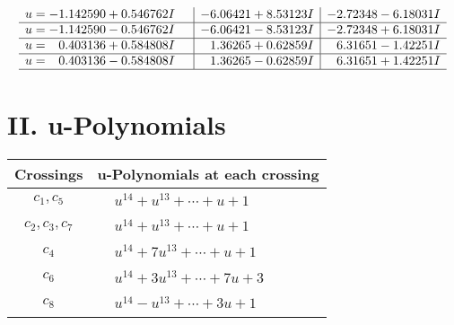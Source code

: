 \documentclass[1p]{elsarticle_modified}
\theoremstyle{definition}
\begin{document}
$$\begin{array}{c|c|c}
\begin{aligned}
u &= -1.142590 + 0.546762 I\end{aligned}
 & -6.06421 + 8.53123 I & -2.72348 - 6.18031 I \\ \hline\begin{aligned}
u &= -1.142590 - 0.546762 I\end{aligned}
 & -6.06421 - 8.53123 I & -2.72348 + 6.18031 I \\ \hline\begin{aligned}
u &= \phantom{-}0.403136 + 0.584808 I\end{aligned}
 & \phantom{-}1.36265 + 0.62859 I & \phantom{-}6.31651 - 1.42251 I \\ \hline\begin{aligned}
u &= \phantom{-}0.403136 - 0.584808 I\end{aligned}
 & \phantom{-}1.36265 - 0.62859 I & \phantom{-}6.31651 + 1.42251 I\\
 \hline 
 \end{array}$$\newpage
\newpage\renewcommand{\arraystretch}{1}
\centering \section*{ II. u-Polynomials}
\begin{tabular}{m{50pt}|m{274pt}}
Crossings & \hspace{64pt}u-Polynomials at each crossing \\
\hline $$\begin{aligned}c_{1},c_{5}\end{aligned}$$&$\begin{aligned}
&u^{14}+u^{13}+\cdots+u+1
\end{aligned}$\\
\hline $$\begin{aligned}c_{2},c_{3},c_{7}\end{aligned}$$&$\begin{aligned}
&u^{14}+u^{13}+\cdots+u+1
\end{aligned}$\\
\hline $$\begin{aligned}c_{4}\end{aligned}$$&$\begin{aligned}
&u^{14}+7 u^{13}+\cdots+u+1
\end{aligned}$\\
\hline $$\begin{aligned}c_{6}\end{aligned}$$&$\begin{aligned}
&u^{14}+3 u^{13}+\cdots+7 u+3
\end{aligned}$\\
\hline $$\begin{aligned}c_{8}\end{aligned}$$&$\begin{aligned}
&u^{14}- u^{13}+\cdots+3 u+1
\end{aligned}$\\
\hline
\end{tabular}\newpage\renewcommand{\arraystretch}{1}
\end{document}

